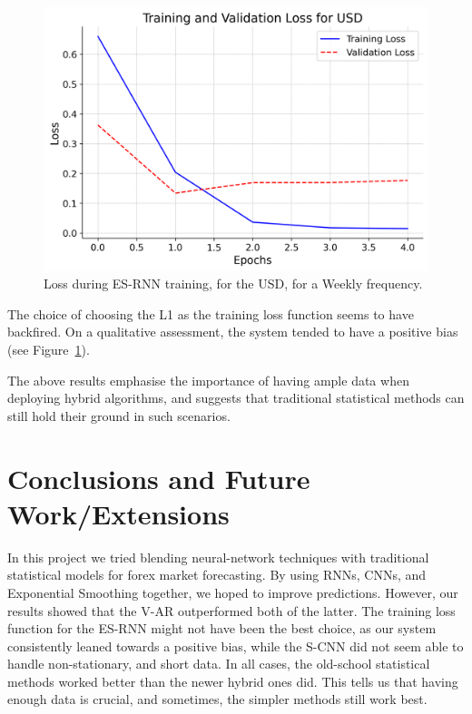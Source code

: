 \documentclass[conference]{IEEEtran}
\begin{document}
\begin{figure}[htbp]
\centerline{\includegraphics[width=\linewidth]{USD_loss_plot.png}}
\caption{Loss during ES-RNN training, for the USD, for a Weekly frequency.}
\label{fig:loss}
\end{figure}

The choice of choosing the L1 as the training loss function seems to have backfired. On a qualitative assessment, the system tended to have a positive bias (see Figure~\ref{fig:loss}). 

The above results emphasise the importance of having ample data when deploying hybrid algorithms, and suggests that traditional statistical methods can still hold their ground in such scenarios.

\section{Conclusions and Future Work/Extensions}

In this project we tried blending neural-network techniques with traditional statistical models for forex market forecasting. By using RNNs, CNNs, and Exponential Smoothing together, we hoped to improve predictions. However, our results showed that the V-AR outperformed both of the latter. The training loss function for the ES-RNN might not have been the best choice, as our system consistently leaned towards a positive bias, while the S-CNN did not seem able to handle non-stationary, and short data. In all cases, the old-school statistical methods worked better than the newer hybrid ones did. This tells us that having enough data is crucial, and sometimes, the simpler methods still work best.
\end{document}
